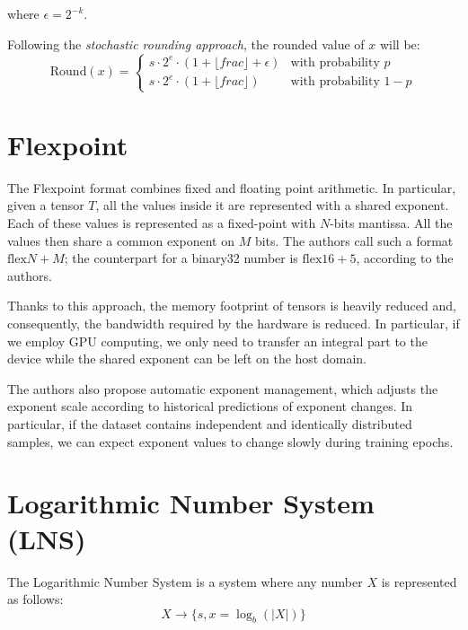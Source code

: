 where $\epsilon = 2^{-k}$.

Following the \textit{stochastic rounding approach}, the rounded value of $x$ will be:
\begin{equation}\label{eqn:bfloat8Rounded}
\text{Round}(x) = 
\left\{\begin{matrix}
s \cdot 2^e \cdot ( 1 + \lfloor frac \rfloor + \epsilon) & \text{with probability } p \\ 
s \cdot 2^e \cdot ( 1 + \lfloor frac \rfloor) & \text{with probability } 1-p 
\end{matrix}\right.
\end{equation}

\section{Flexpoint}
The Flexpoint format \cite{koster2017flexpoint,popescu2018flexpoint} combines fixed and floating point arithmetic. In particular, given a tensor $T$, all the values inside it are represented with a shared exponent. Each of these values is represented as a fixed-point with $N$-bits mantissa. All the values then share a common exponent on $M$ bits. The authors call such a format $\text{flex}N+M$; the counterpart for a binary32 number is $\text{flex}16+5$, according to the authors.

Thanks to this approach, the memory footprint of tensors is heavily reduced and, consequently, the bandwidth required by the hardware is reduced. In particular, if we employ GPU computing, we only need to transfer an integral part to the device while the shared exponent can be left on the host domain. 

The authors also propose automatic exponent management, which adjusts the exponent scale according to historical predictions of exponent changes. In particular, if the dataset contains independent and identically distributed samples, we can expect exponent values to change slowly during training epochs.

\section{Logarithmic Number System (LNS)}

The Logarithmic Number System \cite{johnson2018rethink} is a system where any number $X$ is represented as follows:
\begin{equation}\label{eqn:logNumSysSet}
    X \xrightarrow[]{}\{ s,x = \log_b(\left| X \right|) \}
\end{equation}

